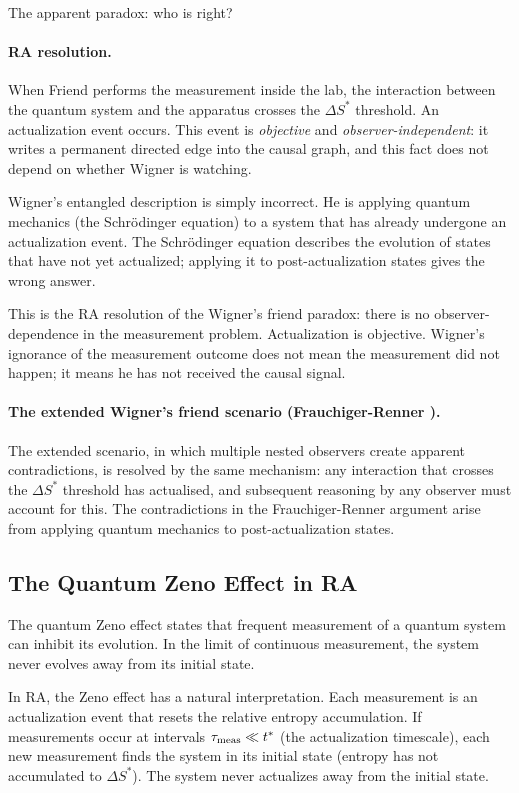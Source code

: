 \documentclass[12pt,a4paper]{article}
\begin{document}
The apparent paradox: who is right?

\paragraph{RA resolution.}  When Friend performs the measurement inside the lab, the interaction between the quantum system and the apparatus crosses the $\Delta S^*$ threshold.  An actualization event occurs.  This event is \emph{objective} and \emph{observer-independent}: it writes a permanent directed edge into the causal graph, and this fact does not depend on whether Wigner is watching.

Wigner's entangled description is simply incorrect.  He is applying quantum mechanics (the Schr\"odinger equation) to a system that has already undergone an actualization event.  The Schr\"odinger equation describes the evolution of states that have not yet actualized; applying it to post-actualization states gives the wrong answer.

This is the RA resolution of the Wigner's friend paradox: there is no observer-dependence in the measurement problem.  Actualization is objective.  Wigner's ignorance of the measurement outcome does not mean the measurement did not happen; it means he has not received the causal signal.

\paragraph{The extended Wigner's friend scenario (Frauchiger-Renner \cite{Frauchiger2018}).}  The extended scenario, in which multiple nested observers create apparent contradictions, is resolved by the same mechanism: any interaction that crosses the $\Delta S^*$ threshold has actualised, and subsequent reasoning by any observer must account for this.  The contradictions in the Frauchiger-Renner argument arise from applying quantum mechanics to post-actualization states.

\subsection{The Quantum Zeno Effect in RA}

The quantum Zeno effect \cite{Misra1977} states that frequent measurement of a quantum system can inhibit its evolution.  In the limit of continuous measurement, the system never evolves away from its initial state.

In RA, the Zeno effect has a natural interpretation.  Each measurement is an actualization event that resets the relative entropy accumulation.  If measurements occur at intervals $\tau_{\rm meas}\ll t^*$ (the actualization timescale), each new measurement finds the system in its initial state (entropy has not accumulated to $\Delta S^*$).  The system never actualizes away from the initial state.
\end{document}
